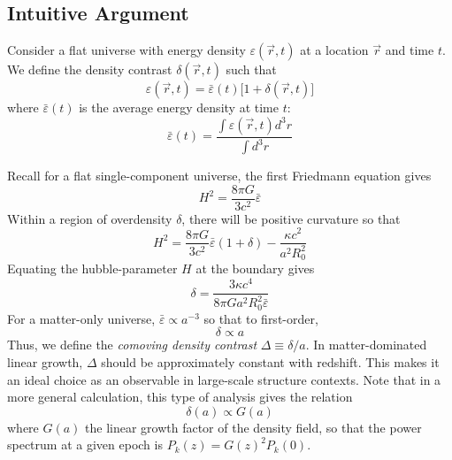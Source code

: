 \documentclass[12pt,preprint]{aastex}			%
\begin{document}
\subsection{Intuitive Argument}
Consider a flat universe with energy density $\varepsilon(\vec{r},t)$ at a location $\vec{r}$ and time $t$.  We define the density contrast $\delta(\vec{r},t)$ such that
\begin{equation}
  \varepsilon(\vec{r},t) = \bar{\varepsilon}(t)\big[1+\delta(\vec{r},t)\big]
\end{equation}
where $\bar{\varepsilon}(t)$ is the average energy density at time $t$:
\begin{equation}
  \bar{\varepsilon}(t) = \frac{\int\varepsilon(\vec{r},t)d^3r }{\int d^3r}
\end{equation}

Recall for a flat single-component universe, the first Friedmann equation gives
\begin{equation}
  H^2 = \frac{8\pi G}{3c^2}\bar{\varepsilon}
\end{equation}
Within a region of overdensity $\delta$, there will be positive curvature so that
\begin{equation}
  H^2 = \frac{8\pi G}{3c^2}\bar{\varepsilon}(1+\delta) - \frac{\kappa c^2}{a^2 R_0^2}
\end{equation}
Equating the hubble-parameter $H$ at the boundary gives
\begin{equation}
  \delta = \frac{3\kappa c^4}{8\pi G a^2 R_0^2 \bar{\varepsilon}}
\end{equation}
For a matter-only universe, $\bar{\varepsilon} \propto a^{-3}$ so that to first-order,
\begin{equation}
  \delta \propto a
\end{equation}
Thus, we define the \textit{comoving density contrast} 
$\Delta \equiv \delta/a$.  In matter-dominated linear growth, $\Delta$ should 
be approximately constant with redshift.  This makes it an ideal choice as an 
observable in large-scale structure contexts.  
Note that in a more general calculation, this type of analysis gives 
the relation 
\begin{equation}
  \label{G_def}
  \delta(a) \propto G(a)
\end{equation}
where $G(a)$ the linear growth factor of the density field, so that the 
power spectrum at a given epoch is $P_k(z) = G(z)^2 P_k(0)$.
\end{document}
